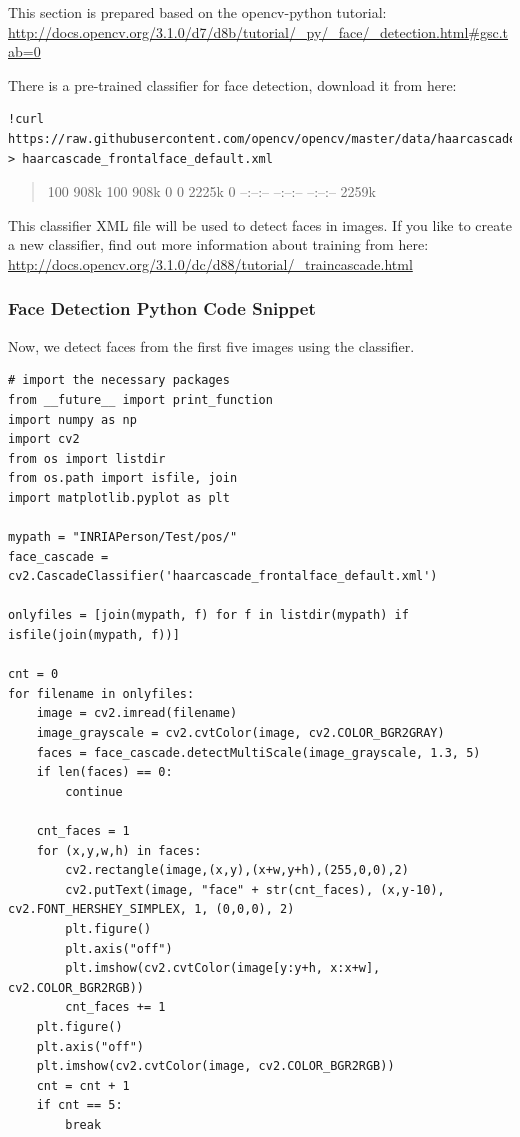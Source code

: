 This section is prepared based on the opencv-python tutorial:
\url{http://docs.opencv.org/3.1.0/d7/d8b/tutorial/_py/_face/_detection.html\#gsc.tab=0}

There is a pre-trained classifier for face detection, download it from
here:

\begin{lstlisting}
!curl https://raw.githubusercontent.com/opencv/opencv/master/data/haarcascades/haarcascade_frontalface_default.xml > haarcascade_frontalface_default.xml
\end{lstlisting}

\begin{quote}
100 908k 100 908k 0 0 2225k 0 --:--:-- --:--:-- --:--:-- 2259k
\end{quote}

This classifier XML file will be used to detect faces in images. If you
like to create a new classifier, find out more information about
training from here:
\url{http://docs.opencv.org/3.1.0/dc/d88/tutorial/_traincascade.html}

\subsubsection{Face Detection Python Code
Snippet}\label{face-detection-python-code-snippet}

Now, we detect faces from the first five images using the classifier.

\begin{lstlisting}
# import the necessary packages
from __future__ import print_function
import numpy as np
import cv2
from os import listdir
from os.path import isfile, join
import matplotlib.pyplot as plt

mypath = "INRIAPerson/Test/pos/"
face_cascade = cv2.CascadeClassifier('haarcascade_frontalface_default.xml')

onlyfiles = [join(mypath, f) for f in listdir(mypath) if isfile(join(mypath, f))]

cnt = 0
for filename in onlyfiles:
    image = cv2.imread(filename)
    image_grayscale = cv2.cvtColor(image, cv2.COLOR_BGR2GRAY)
    faces = face_cascade.detectMultiScale(image_grayscale, 1.3, 5)
    if len(faces) == 0:
        continue

    cnt_faces = 1
    for (x,y,w,h) in faces:
        cv2.rectangle(image,(x,y),(x+w,y+h),(255,0,0),2)
        cv2.putText(image, "face" + str(cnt_faces), (x,y-10), cv2.FONT_HERSHEY_SIMPLEX, 1, (0,0,0), 2)
        plt.figure()
        plt.axis("off")
        plt.imshow(cv2.cvtColor(image[y:y+h, x:x+w], cv2.COLOR_BGR2RGB))
        cnt_faces += 1
    plt.figure()
    plt.axis("off")
    plt.imshow(cv2.cvtColor(image, cv2.COLOR_BGR2RGB))        
    cnt = cnt + 1
    if cnt == 5:
        break
\end{lstlisting}

